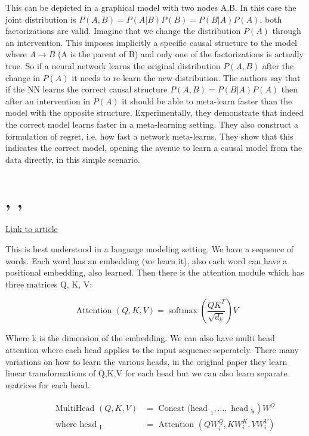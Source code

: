 \documentclass{article}
\newcommand{\citeall}[1]{\citeauthor{#1}, \citetitle{#1}, \citeyear{#1}}
\begin{document}
This can be depicted in a graphical model with two nodes A,B. In this case the joint distribution is $P(A,B) = P(A|B)P(B) = P(B|A)P(A)$, both factorizations are valid. Imagine that we change the distribution $P(A)$ through an intervention. This imposes implicitly a specific causal structure to the model where $A \rightarrow B$ (A is the parent of B) and only one of the factorizations is actually true. So if a neural network learns the original distribution $P(A,B)$ after the change in $P(A)$ it needs to re-learn the new distribution. The authors say that if the NN learns the correct causal structure $P(A,B) = P(B|A)P(A)$ then after an intervention in $P(A)$ it should be able to meta-learn faster than the model with the opposite structure. Experimentally, they demonstrate that indeed the correct model learns faster in a meta-learning setting. They also construct a formulation of regret, i.e. how fast a network meta-learns. They show that this indicates the correct model, opening the avenue to learn a causal model from the data directly, in this simple scenario.  

\section{\citeall{Vaswani2017AttentionNeed}}

\href{http://www.peterbloem.nl/blog/transformers}{Link to article}

This is best understood in a language modeling setting. We have a sequence of words. Each word has an embedding (we learn it), also each word can have a positional embedding, also learned. Then there is the attention module which has three matrices Q, K, V:

\begin{equation}
\text { Attention }(Q, K, V)=\operatorname{softmax}\left(\frac{Q K^{T}}{\sqrt{d_{k}}}\right) V
\end{equation}

Where k is the dimension of the embedding. We can also have multi head attention where each head applies to the input sequence seperately. There many variations on how to learn the various heads, in the original paper they learn linear transformations of Q,K,V for each head but we can also learn separate matrices for each head.

\begin{equation}
\begin{array}{l}\qquad \begin{aligned} \text { MultiHead }(Q, K, V) &\left.=\text { Concat (head }_{1}, \ldots, \text { head }_{\mathbf{h}}\right) W^{O} \\ \text { where head }_{\mathbf{i}} &=\text { Attention }\left(Q W_{i}^{Q}, K W_{i}^{K}, V W_{i}^{V}\right) \end{aligned} \end{array}
\end{equation}
\end{document}
